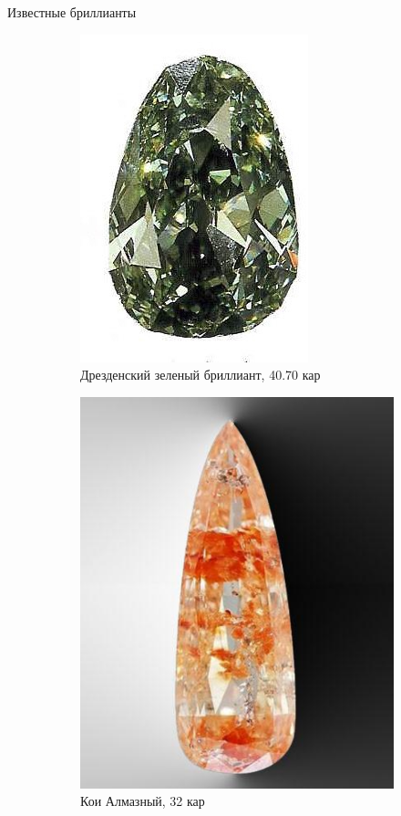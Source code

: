 \documentclass[_Banking_p3.tex]{subfiles}
\begin{document}
\begin{frame}{Известные бриллианты}
\begin{figure}	
	\centering
	\begin{subfigure}[t]{4.3cm}
		\centering
		\includegraphics[scale=0.55]{img/drezden1.png}
	\caption{Дрезденский зеленый бриллиант, 40.70 кар}\label{fig:drezden1}	
	\end{subfigure}
	\quad
	\begin{subfigure}[t]{4.3cm}
		\centering
		\includegraphics[scale=0.25]{img/koi_diamond.png}
		\caption{Кои Алмазный, 32 кар}\label{fig:koi_diamond}
	\end{subfigure}
	\caption{}\label{fig:diamonds3}
\end{figure}
\end{frame}
\end{document}
